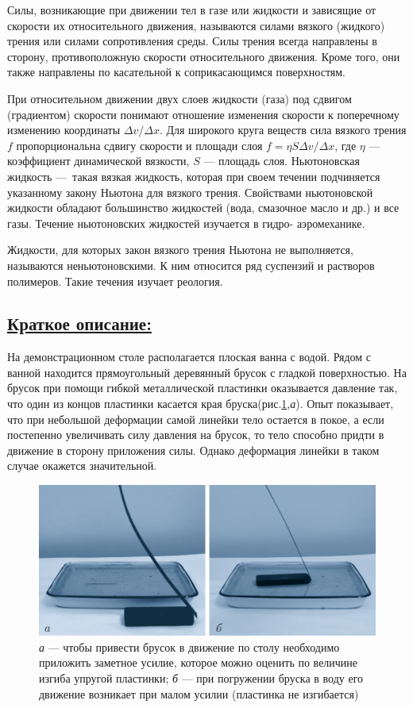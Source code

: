 \documentclass[14pt,a4paper,oneside]{extarticle}	%
\begin{document}
	Силы, возникающие при движении тел в газе или жидкости 
	и зависящие от скорости их относительного движения, называются 
	силами вязкого (жидкого) трения или силами сопротивления среды. 
	Силы трения всегда направлены в сторону, противоположную скорости относительного 
	движения.
	Кроме того, они также направлены по касательной к соприкасающимся поверхностям.
		
	При относительном движении двух слоев жидкости (газа) под сдвигом (градиентом) скорости понимают отношение изменения скорости к поперечному изменению координаты $\Delta v / \Delta x $. Для широкого круга веществ сила вязкого трения $f$ пропорциональна сдвигу скорости и площади слоя $f = \eta S \Delta v / \Delta x$, где $\eta $ — коэффициент динамической вязкости, $S$ — площадь слоя.
	Ньютоновская жидкость — такая вязкая жидкость, которая при своем течении подчиняется указанному закону Ньютона для вязкого трения.
	Свойствами ньютоновской жидкости обладают большинство жидкостей (вода, смазочное масло и др.) и все газы. 
	Течение ньютоновских жидкостей изучается в гидро- аэромеханике. 
	
	Жидкости, для которых закон вязкого трения Ньютона не выполняется, называются неньютоновскими.
	К ним относится ряд суспензий и растворов полимеров. 
	Такие течения изучает реология.

	\subsection*{\underline{Краткое описание:}}
	
	На демонстрационном столе располагается плоская ванна с водой.
	Рядом с ванной находится прямоугольный деревянный брусок с гладкой поверхностью.
	На брусок при помощи гибкой металлической пластинки оказывается давление так, что один из концов пластинки касается края бруска(рис.\ref{friction-2},\textit{а}).
	Опыт показывает, что при небольшой деформации самой линейки тело остается в покое, 
	а если постепенно увеличивать силу давления на брусок, то тело способно придти в движение в сторону приложения силы.
	Однако деформация линейки в таком случае окажется значительной.
		
		\begin{figure}[H] 
			\centering 	
			\includegraphics[width=0.9\linewidth]{friction-2.png}
			\caption{\textit{а} — чтобы привести брусок в движение по столу необходимо приложить заметное усилие, которое можно оценить по величине изгиба упругой пластинки; \textit{б} — при погружении бруска в воду его движение возникает при малом усилии (пластинка не изгибается) }
			\label{friction-2}
		\end{figure}
	
\end{document}
